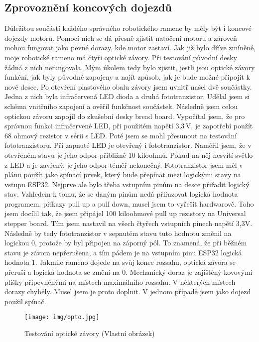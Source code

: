 \subsection{Zprovoznění koncových dojezdů}
Důležitou součástí každého správného robotického ramene by měly být i koncové 
dojezdy motorů. Pomocí nich se dá přesně zjistit natočení motoru a zároveň mohou fungovat 
jako pevné dorazy, kde motor zastaví. Jak již bylo dříve zmíněné, moje robotické rameno má 
čtyři optické závory. Při testování původní desky žádná z nich nefungovala. Mým úkolem tedy 
bylo zjistit, jestli jsou optické závory funkční, jak byly původně zapojeny a najít způsob, jak je
bude možné připojit k nové desce. Po otevření plastového obalu závory jsem uvnitř našel dvě 
součástky. Jedna z nich byla infračervená LED dioda a druhá fototranzistor. Udělal jsem si 
schéma vnitřního zapojení a ověřil funkčnost součástek. Následně jsem celou optickou závoru 
zapojil do zkušební desky bread board. Vypočítal jsem, že pro správnou funkci infračervené 
LED, při použitém napětí 3,3\,V, je zapotřebí použít 68 ohmový rezistor v sérii s LED. Poté jsem 
se mohl přesunout na testování fototranzistoru. Při zapnuté LED je otevřený i fototranzistor. 
Naměřil jsem, že v otevřeném stavu je jeho odpor přibližně 10 kiloohmů. Pokud na něj nesvítí 
světlo z LED a je zavřený, je jeho odpor téměř nekonečný. Fototranzistor jsem měl v plánu 
použít jako spínací prvek, který bude přepínat mezi logickými stavy na vstupu ESP32. Nejprve 
ale bylo třeba vstupním pinům na desce přiřadit logický stav. Vzhledem k tomu, že se daným 
pinům nedá přiřazovat logická hodnota programem, příkazy pull up a pull down, musel jsem to 
vyřešit hardwarově. Toho jsem docílil tak, že jsem připájel 100 kiloohmové pull up rezistory 
na Universal stepper board. Tím jsem nastavil na všech čtyřech vstupních pinech napětí 3,3V. 
Následně by tedy fototranzistor v sepnutém stavu tuto hodnotu změnil na logickou 0, protože 
by byl připojen na záporný pól. To znamená, že při běžném stavu je závora nepřerušena, a tím 
pádem je na vstupním pinu ESP32 logická hodnota 1. Jakmile rameno dojede na svůj konec 
rozsahu, optická závora se přeruší a logická hodnota se změní na 0. Mechanický doraz je 
zajištěný kovovými plíšky připevněnými na místech maximálního rozsahu. V některých 
místech dorazy chyběly. Musel jsem je proto doplnit. V jednom případě jsem jako dojezd použil 
spínač. \cite{bibtex:Kratochvíl}

\begin{figure}
		\begin{center}
			\texttt{[image: img/opto.jpg]}
			\caption{Testování optické závory (Vlastní obrázek)}
			\label{fig:opto}
		\end{center}
		\vspace{0mm}
\end{figure}

